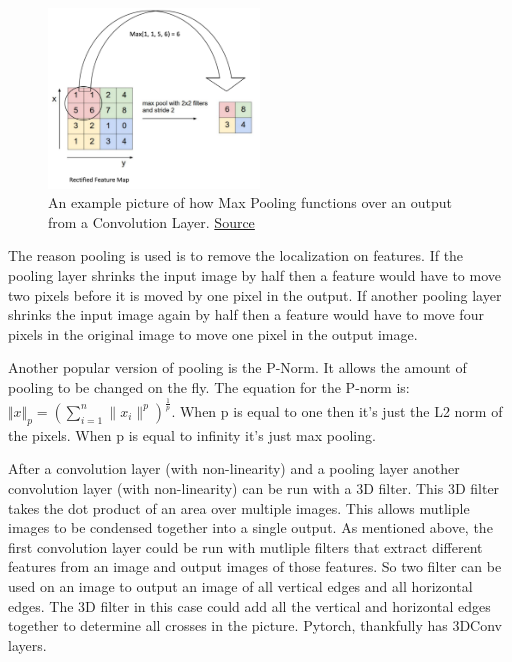 \documentclass{article}
\begin{document}
\begin{figure}[ht!]
  \centering
      \includegraphics[width=0.5\textwidth]{MaxPooling.png}
          \caption{
            An example picture of how Max Pooling functions over an output from a Convolution Layer.
            \href{https://ulkarn.me/2016/08/11/intuitive-explanation-convnets/}{Source}
          }
\end{figure}

\noindent The reason pooling is used is to remove the localization on features.
If the pooling layer shrinks the input image by half then a feature would have to move two pixels before it is moved by one pixel in the output.
If another pooling layer shrinks the input image again by half then a feature would have to move four pixels in the original image to move one pixel in the output image.

\vspace{3mm}

\noindent Another popular version of pooling is the P-Norm.
It allows the amount of pooling to be changed on the fly.
The equation for the P-norm is: $\Vert x\Vert _p = (\sum_{i=1}^{n} \|x_i\|^p)^{\frac{1}{p}}$.
When p is equal to one then it's just the L2 norm of the pixels.
When p is equal to infinity it's just max pooling.

\vspace{3mm}

\noindent After a convolution layer (with non-linearity) and a pooling layer another convolution layer (with non-linearity) can be run with a 3D filter.
This 3D filter takes the dot product of an area over multiple images.
This allows mutliple images to be condensed together into a single output.
As mentioned above, the first convolution layer could be run with mutliple filters that extract different features from an image and output images of those features.
So two filter can be used on an image to output an image of all vertical edges and all horizontal edges.
The 3D filter in this case could add all the vertical and horizontal edges together to determine all crosses in the picture.
Pytorch, thankfully has 3DConv layers.
\end{document}
